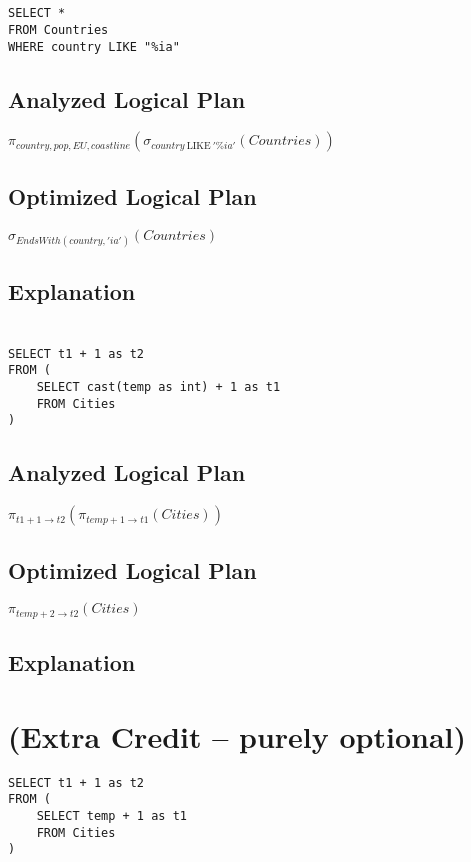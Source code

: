 \documentclass[12pt]{article}
\begin{document}
\newpage

\section{}
\begin{verbatim}
SELECT *
FROM Countries
WHERE country LIKE "%ia"
\end{verbatim}

\subsection*{Analyzed Logical Plan}
$\pi_{country, pop, EU, coastline}(\sigma_{country\ \mathrm{LIKE}\ '\%ia'}(Countries))$

\subsection*{Optimized Logical Plan}
$\sigma_{EndsWith(country, 'ia')}(Countries)$

\subsection*{Explanation}

\newpage

\section{}
\begin{verbatim}
SELECT t1 + 1 as t2
FROM (
    SELECT cast(temp as int) + 1 as t1
    FROM Cities
)
\end{verbatim}

\subsection*{Analyzed Logical Plan}
$\pi_{t1 + 1 \to t2}(\pi_{temp + 1 \to t1}(Cities))$

\subsection*{Optimized Logical Plan}
$\pi_{temp + 2 \to t2}(Cities)$

\subsection*{Explanation}

\newpage

\section{(Extra Credit -- purely optional)}
\begin{verbatim}
SELECT t1 + 1 as t2
FROM (
    SELECT temp + 1 as t1
    FROM Cities
)
\end{verbatim}
\end{document}
